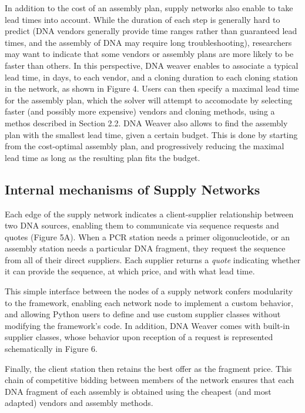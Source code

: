 In addition to the cost of an assembly plan, supply networks also enable to take lead times into account. While the duration of each step is generally hard to predict (DNA vendors generally provide time ranges rather than guaranteed lead times, and the assembly of DNA may require long troubleshooting), researchers may want to indicate that some vendors or assembly plans are more likely to be faster than others. In this perspective, DNA weaver enables to associate a typical lead time, in days, to each vendor, and a cloning duration to each cloning station in the network, as shown in Figure 4. Users can then specify a maximal lead time for the assembly plan, which the solver will attempt to accomodate by selecting faster (and possibly more expensive) vendors and cloning methods, using a methos described in Section 2.2. DNA Weaver also allows to find the assembly plan with the smallest lead time, given a certain budget. This is done by starting from the cost-optimal assembly plan, and progressively reducing the maximal lead time as long as the resulting plan fits the budget.



\subsection{Internal mechanisms of Supply Networks}

Each edge of the supply network indicates a client-supplier relationship between two DNA sources, enabling them to communicate via sequence requests and quotes (Figure 5A). When a PCR station needs a primer oligonucleotide, or an assembly station needs a particular DNA fragment, they request the sequence from all of their direct suppliers. Each supplier returns a \textit{quote} indicating whether it can provide the sequence, at which price, and with what lead time.

This simple interface between the nodes of a supply network confers modularity to the framework, enabling each network node to implement a custom behavior, and allowing Python users to define and use custom supplier classes without modifying the framework's code. In addition, DNA Weaver comes with built-in supplier classes, whose behavior upon reception of a request is represented schematically in Figure 6.

Finally, the client station then retains the best offer as the fragment price. This chain of competitive bidding between members of the network ensures that each DNA fragment of each assembly is obtained using the cheapest (and most adapted) vendors and assembly methods.


